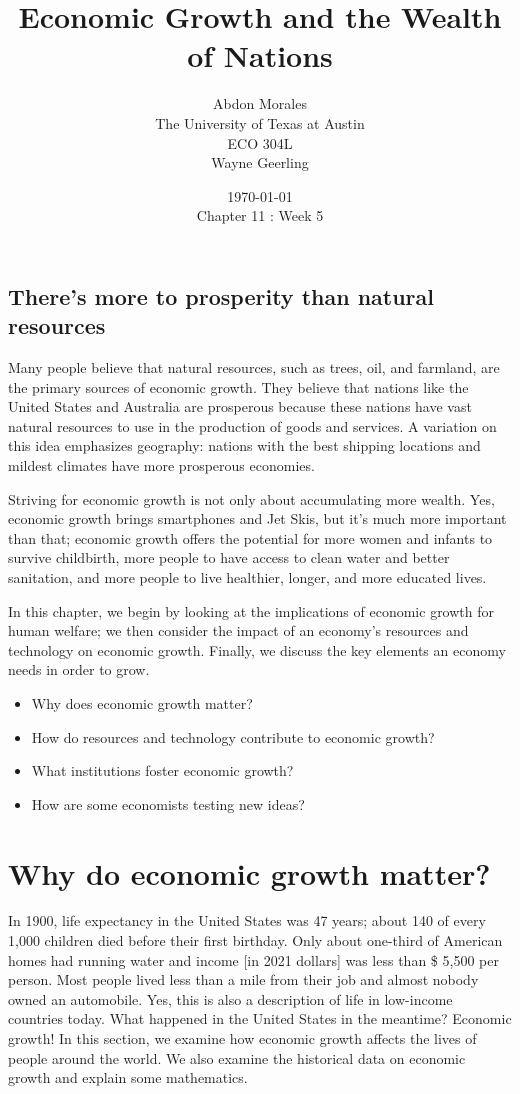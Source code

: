\documentclass[11pt]{article} %
\title{Economic Growth and the Wealth of Nations}
\author{Abdon Morales \\ The University of Texas at Austin \\ ECO 304L \\ Wayne Geerling}
\date{\today \\ Chapter 11 : Week 5}
\theoremstyle{plain}
\theoremstyle{definition}
\begin{document}
\maketitle
\subsection*{There's more to prosperity than natural resources}

Many people believe that natural resources, such as trees, oil, and farmland, are the primary sources of economic growth. They believe that nations like the United States and Australia are prosperous because these nations have vast natural resources to use in the production of goods and services. A variation on this idea emphasizes geography: nations with the best shipping locations and mildest climates have more prosperous economies.

Striving for economic growth is not only about accumulating more wealth. Yes, economic growth brings smartphones and Jet Skis, but it's much more important than that; economic growth offers the potential for more women and infants to survive childbirth, more people to have access to clean water and better sanitation, and more people to live healthier, longer, and more educated lives.

In this chapter, we begin by looking at the implications of economic growth for human welfare; we then consider the impact of an economy's resources and technology on economic growth. Finally, we discuss the key elements an economy needs in order to grow.
\begin{tcolorbox}[width=\textwidth,colback={white},title={Big Questions},colbacktitle=yellow,coltitle=blue]
\begin{itemize}
\item Why does economic growth matter?
\item How do resources and technology contribute to economic growth?
\item What institutions foster economic growth?
\item How are some economists testing new ideas?
\end{itemize}
\end{tcolorbox}

\newpage

\section*{Why do economic growth matter?}
In 1900, life expectancy in the United States was 47 years; about 140 of every 1,000 children died before their first birthday. Only about one-third of American homes had running water and income [in 2021 dollars] was less than \$ 5,500 per person. Most people lived less than a mile from their job and almost nobody owned an automobile. Yes, this is also a description of life in low-income countries today. What happened in the United States in the meantime? Economic growth!
In this section, we examine how economic growth affects the lives of people around the world. We also examine the historical data on economic growth and explain some mathematics.
\end{document}
